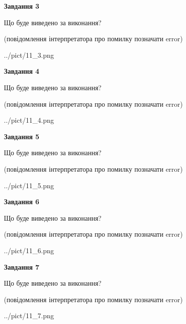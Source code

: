\documentclass[12pt, ukrainian]{article}
\begin{document}
{\begin {large}
{\begin {center}\textbf{Завдання 3}\end {center}}\par
Що буде виведено за виконання?\par
 (повідомлення інтерпретатора про помилку позначати error)\par
\begin{center}
	{../pict/11_3.png}
\end{center}
\newpage

{\begin {center}\textbf{Завдання 4}\end {center}}\par
Що буде виведено за виконання?\par
 (повідомлення інтерпретатора про помилку позначати error)\par
\begin{center}
	{../pict/11_4.png}
\end{center}
\newpage

{\begin {center}\textbf{Завдання 5}\end {center}}\par
Що буде виведено за виконання?\par
 (повідомлення інтерпретатора про помилку позначати error)\par
\begin{center}
	{../pict/11_5.png}
\end{center}
\newpage

{\begin {center}\textbf{Завдання 6}\end {center}}\par
Що буде виведено за виконання?\par
 (повідомлення інтерпретатора про помилку позначати error)\par
\begin{center}
	{../pict/11_6.png}
\end{center}
\newpage

{\begin {center}\textbf{Завдання 7}\end {center}}\par
Що буде виведено за виконання?\par
 (повідомлення інтерпретатора про помилку позначати error)\par
\begin{center}
	{../pict/11_7.png}
\end{center}
\newpage


\end{large}}
\end{document}
